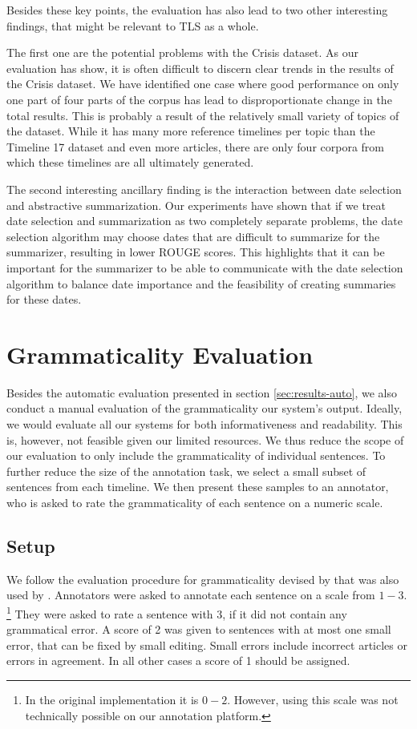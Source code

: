 \documentclass[a4paper,BCOR=10mm]{report}
\numberwithin{lemma}{chapter}
\numberwithin{definition}{chapter}
\begin{document}
Besides these key points, the evaluation has also lead to two other interesting findings, that might be relevant to TLS as a whole.

The first one are the potential problems with the Crisis dataset.
As our evaluation has show, it is often difficult to discern clear trends in the results of the Crisis dataset.
We have identified one case where good performance on only one part of four parts of the corpus has lead to disproportionate change in the total results.
This is probably a result of the relatively small variety of topics of the dataset. While it has many more reference timelines per topic than the Timeline 17 dataset and even more articles, there are only four corpora from which these timelines are all ultimately generated.

The second interesting ancillary finding is the interaction between date selection and abstractive summarization.
Our experiments have shown that if we treat date selection and summarization as two completely separate problems, the date selection algorithm may choose dates that are difficult to summarize for the summarizer, resulting in lower ROUGE scores. This highlights that it can be important for the summarizer to be able to communicate with the date selection algorithm to balance date importance and the feasibility of creating summaries for these dates.

\chapter{Grammaticality Evaluation} \label{sec:results-manual}

Besides the automatic evaluation presented in section \ref{sec:results-auto}, we also conduct a manual evaluation of the grammaticality our system's output.
Ideally, we would evaluate all our systems for both informativeness and readability. This is, however, not feasible given our limited resources.
We thus reduce the scope of our evaluation to only include the grammaticality of individual sentences.
To further reduce the size of the annotation task, we select a small subset of sentences from each timeline.
We then present these samples to an annotator, who is asked to rate the grammaticality of each sentence on a numeric scale.

\section{Setup}

We follow the evaluation procedure for grammaticality devised by \citet{mckeown} that was also used by \citet{filippova}.
Annotators were asked to annotate each sentence on a scale from $1-3$. \footnote{In the original implementation it is $0-2$. However, using this scale was not technically possible on our annotation platform.} They were asked to rate a sentence with 3, if it did not contain any grammatical error. A score of 2 was given to sentences with at most one small error, that can be fixed by small editing. Small errors include incorrect articles or errors in agreement. In all other cases a score of 1 should be assigned.
\end{document}
